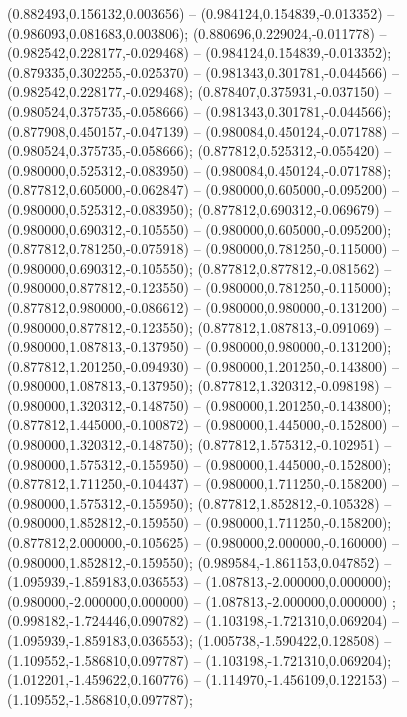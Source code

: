  (0.882493,0.156132,0.003656) -- (0.984124,0.154839,-0.013352) -- (0.986093,0.081683,0.003806);
 (0.880696,0.229024,-0.011778) -- (0.982542,0.228177,-0.029468) -- (0.984124,0.154839,-0.013352);
 (0.879335,0.302255,-0.025370) -- (0.981343,0.301781,-0.044566) -- (0.982542,0.228177,-0.029468);
 (0.878407,0.375931,-0.037150) -- (0.980524,0.375735,-0.058666) -- (0.981343,0.301781,-0.044566);
 (0.877908,0.450157,-0.047139) -- (0.980084,0.450124,-0.071788) -- (0.980524,0.375735,-0.058666);
 (0.877812,0.525312,-0.055420) -- (0.980000,0.525312,-0.083950) -- (0.980084,0.450124,-0.071788);
 (0.877812,0.605000,-0.062847) -- (0.980000,0.605000,-0.095200) -- (0.980000,0.525312,-0.083950);
 (0.877812,0.690312,-0.069679) -- (0.980000,0.690312,-0.105550) -- (0.980000,0.605000,-0.095200);
 (0.877812,0.781250,-0.075918) -- (0.980000,0.781250,-0.115000) -- (0.980000,0.690312,-0.105550);
 (0.877812,0.877812,-0.081562) -- (0.980000,0.877812,-0.123550) -- (0.980000,0.781250,-0.115000);
 (0.877812,0.980000,-0.086612) -- (0.980000,0.980000,-0.131200) -- (0.980000,0.877812,-0.123550);
 (0.877812,1.087813,-0.091069) -- (0.980000,1.087813,-0.137950) -- (0.980000,0.980000,-0.131200);
 (0.877812,1.201250,-0.094930) -- (0.980000,1.201250,-0.143800) -- (0.980000,1.087813,-0.137950);
 (0.877812,1.320312,-0.098198) -- (0.980000,1.320312,-0.148750) -- (0.980000,1.201250,-0.143800);
 (0.877812,1.445000,-0.100872) -- (0.980000,1.445000,-0.152800) -- (0.980000,1.320312,-0.148750);
 (0.877812,1.575312,-0.102951) -- (0.980000,1.575312,-0.155950) -- (0.980000,1.445000,-0.152800);
 (0.877812,1.711250,-0.104437) -- (0.980000,1.711250,-0.158200) -- (0.980000,1.575312,-0.155950);
 (0.877812,1.852812,-0.105328) -- (0.980000,1.852812,-0.159550) -- (0.980000,1.711250,-0.158200);
 (0.877812,2.000000,-0.105625) -- (0.980000,2.000000,-0.160000) -- (0.980000,1.852812,-0.159550);
 (0.989584,-1.861153,0.047852) -- (1.095939,-1.859183,0.036553) -- (1.087813,-2.000000,0.000000);
 (0.980000,-2.000000,0.000000) -- (1.087813,-2.000000,0.000000) ;
 (0.998182,-1.724446,0.090782) -- (1.103198,-1.721310,0.069204) -- (1.095939,-1.859183,0.036553);
 (1.005738,-1.590422,0.128508) -- (1.109552,-1.586810,0.097787) -- (1.103198,-1.721310,0.069204);
 (1.012201,-1.459622,0.160776) -- (1.114970,-1.456109,0.122153) -- (1.109552,-1.586810,0.097787);
